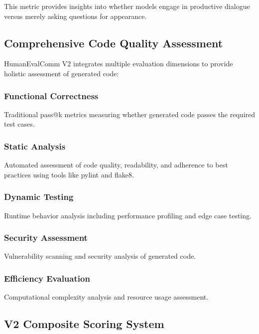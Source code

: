 \documentclass[conference]{IEEEtran}
\begin{document}
This metric provides insights into whether models engage in productive dialogue versus merely asking questions for appearance.

\subsection{Comprehensive Code Quality Assessment}

HumanEvalComm V2 integrates multiple evaluation dimensions to provide holistic assessment of generated code:

\subsubsection{Functional Correctness}

Traditional pass@k metrics measuring whether generated code passes the required test cases.

\subsubsection{Static Analysis}

Automated assessment of code quality, readability, and adherence to best practices using tools like pylint and flake8.

\subsubsection{Dynamic Testing}

Runtime behavior analysis including performance profiling and edge case testing.

\subsubsection{Security Assessment}

Vulnerability scanning and security analysis of generated code.

\subsubsection{Efficiency Evaluation}

Computational complexity analysis and resource usage assessment.

\subsection{V2 Composite Scoring System}
\end{document}
